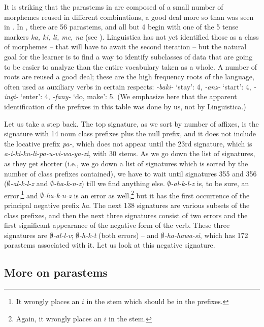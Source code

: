 \documentclass[output=paper,colorlinks,citecolor=brown]{langscibook}
\begin{document}
It is striking that the parastems in  are composed of a small number of morphemes reused in different combinations, a good deal more so than was seen in . In , there are 56 parastems, and all but 4 begin with one of the 5 tense markers \textit{ka, ki, li, me, na} (see ). Linguistica has not yet identified those as a class of morphemes -- that will have to await the second iteration -- but the natural goal for the learner is to find a way to identify subclasses of data that are going to be easier to analyze than the entire vocabulary taken as a whole.  A number of roots are reused a good deal; these are the high frequency roots of the language, often used as auxiliary verbs in certain respects: \textit{-baki-} `stay': 4, \textit{-anz-} `start': 4, \textit{-ingi-} `enter': 4, \textit{-fany-} `do, make': 5. (We emphasize here that the apparent identification of the prefixes in this table was done by us, not by Linguistica.) 


Let us take a step back. The top signature, as we sort by number of affixes, is the signature with 14 noun class prefixes plus the null prefix, and it does not include the locative prefix \textit{pa-}, which does not appear until the 23rd signature, which is \textit{a-i-ki-ku-li-pa-u-vi-wa-ya-zi}, with 30 stems.  As we go down the list of signatures, as they get shorter (i.e., we go down a list of signatures which is sorted by the number of class prefixes contained), we have to wait until signatures 355 and 356 (\textit{$\emptyset$-al-k-l-z} and \textit{$\emptyset$-ha-k-n-z}) till we find anything else. \textit{$\emptyset$-al-k-l-z} is, to be sure, an error,\footnote{It wrongly places an $i$ in the stem which should be in the prefixes.} and \textit{$\emptyset$-ha-k-n-z} is an error as well,\footnote{Again, it wrongly places an $i$ in the stem.} but it has the first occurrence of the principal negative prefix \textit{ha}. The next 138 signatures are various subsets of the class prefixes, and then the next three signatures consist of two errors and the first significant appearance of the negative form of the verb. These three signatures are \textit{$\emptyset$-al-l-v}; \textit{$\emptyset$-h-k-t} (both errors) -- and \textit{$\emptyset$-ha-hawa-si}, which has 172 parastems associated with it. Let us look at this negative signature.
 
\subsection{More on parastems}
\end{document}
